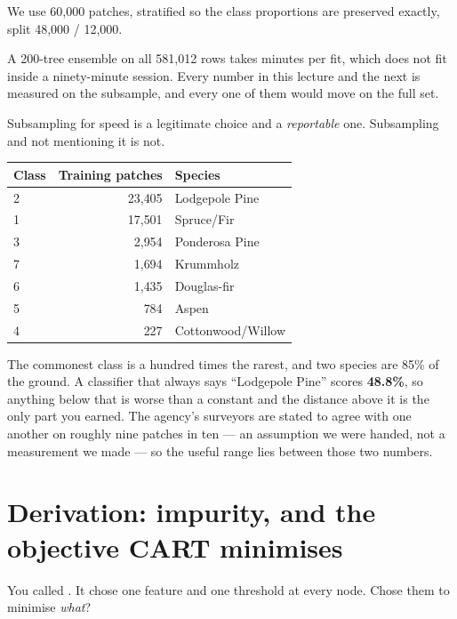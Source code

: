 \documentclass[11pt,a4paper]{article}
\begin{document}
We use 60{,}000 patches, stratified so the class proportions are preserved
exactly, split 48{,}000 / 12{,}000.

\begin{failbox}[title={Failure condition --- numbers measured on a subsample}]
A 200-tree ensemble on all 581{,}012 rows takes minutes per fit, which does not
fit inside a ninety-minute session. Every number in this lecture and the next
is measured on the subsample, and every one of them would move on the full set.

Subsampling for speed is a legitimate choice and a \emph{reportable} one.
Subsampling and not mentioning it is not.
\end{failbox}

\begin{center}
\small
\begin{tabular}{lrl}
\toprule
\textbf{Class} & \textbf{Training patches} & \textbf{Species} \\
\midrule
2 & 23{,}405 & Lodgepole Pine \\
1 & 17{,}501 & Spruce/Fir \\
3 &  2{,}954 & Ponderosa Pine \\
7 &  1{,}694 & Krummholz \\
6 &  1{,}435 & Douglas-fir \\
5 &    784 & Aspen \\
4 &    227 & Cottonwood/Willow \\
\bottomrule
\end{tabular}
\end{center}

The commonest class is a hundred times the rarest, and two species are 85\% of
the ground. A classifier that always says ``Lodgepole Pine'' scores
\textbf{48.8\%}, so anything below that is worse than a constant and the
distance above it is the only part you earned. The agency's surveyors are
stated to agree with one another on roughly nine patches in ten --- an
assumption we were handed, not a measurement we made --- so the useful range
lies between those two numbers.

\section{Derivation: impurity, and the objective CART minimises}

You called . It chose one feature and one
threshold at every node. Chose them to minimise \emph{what}?
\end{document}
